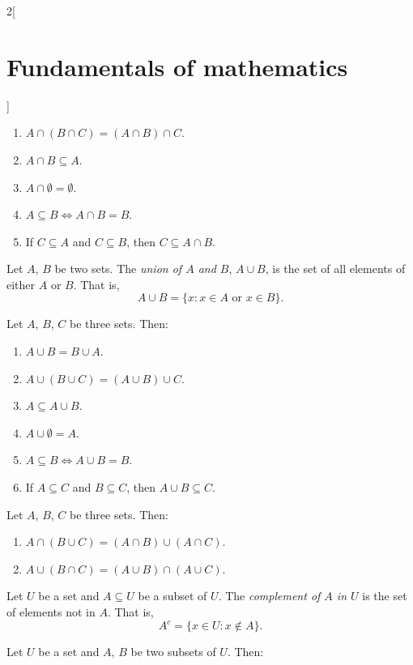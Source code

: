 \documentclass[../../../main.tex]{subfiles}
\begin{document}
\begin{multicols}{2}[\section{Fundamentals of mathematics}]
\begin{prop}
\begin{enumerate}
            \item $A\cap(B\cap C)=(A\cap B)\cap C$.
            \item $A\cap B\subseteq A$.
            \item $A\cap\emptyset=\emptyset$.
            \item $A\subseteq B\iff A\cap B=B$.
            \item If $C\subseteq A$ and $C\subseteq B$, then $C\subseteq A\cap B$.
        \end{enumerate}
    \end{prop}
    \begin{definition}
        Let $A$, $B$ be two sets. The \textit{union of $A$ and $B$}, $A\cup B$, is the set of all elements of either $A$ or $B$. That is, $$A\cup B=\{x:x\in A\text{ or }x\in B\}.$$
    \end{definition}
    \begin{prop}
        Let $A$, $B$, $C$ be three sets. Then:
        \begin{enumerate}
            \item $A\cup B=B\cup A$.
            \item $A\cup(B\cup C)=(A\cup B)\cup C$.
            \item $A\subseteq A\cup B$.
            \item $A\cup\emptyset=A$.
            \item $A\subseteq B\iff A\cup B=B$.
            \item If $A\subseteq C$ and $B\subseteq C$, then $A\cup B\subseteq C$.
        \end{enumerate}
    \end{prop}
    \begin{prop}
        Let $A$, $B$, $C$ be three sets. Then:
        \begin{enumerate}
            \item $A\cap (B\cup C)=(A\cap B)\cup (A\cap C)$.
            \item $A\cup (B\cap C)=(A\cup B)\cap (A\cup C)$.
        \end{enumerate}
    \end{prop}
    \begin{definition}
        Let $U$ be a set and $A\subseteq U$ be a subset of $U$. The \textit{complement of $A$ in $U$} is the set of elements not in $A$. That is, $$A^c=\{x\in U:x\notin A\}.$$
    \end{definition}
    \begin{prop}
        Let $U$ be a set and $A$, $B$ be two subsets of $U$. Then:

\end{prop}
\end{multicols}
\end{document}

